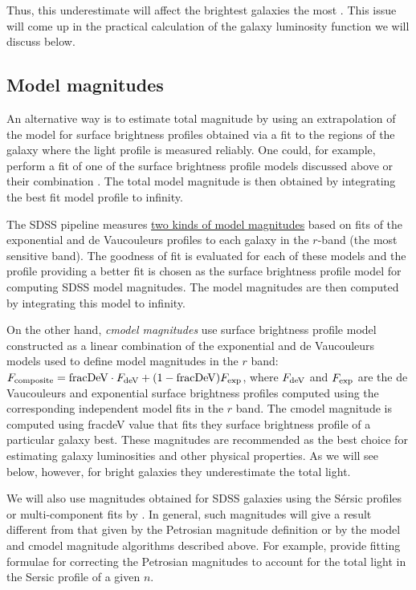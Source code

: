  Thus, this underestimate will affect the brightest galaxies the most \href{http://adsabs.harvard.edu/abs/2013MNRAS.436..697B}{\citep[see][]{bernardi_etal13}}. This issue will come up in the practical calculation of the galaxy luminosity function we will discuss below. 

\subsection{Model magnitudes}

An alternative way is to estimate total magnitude by using an extrapolation of the model for surface brightness profiles obtained via a fit to the regions of the galaxy where the light profile is measured reliably. One could, for example, perform a fit of one of the surface brightness profile models discussed above or their combination \citep[e.g., see][for a recent example of such fits for SDSS galaxies]{meert_etal15}. The total model magnitude is then obtained by integrating the best fit model profile to infinity. 

The SDSS pipeline measures \href{http://classic.sdss.org/dr7/algorithms/photometry.html}{two kinds of model magnitudes} based on fits of the exponential and de Vaucouleurs profiles to each galaxy in the $r$-band (the most sensitive band). The goodness of fit is evaluated for each of these models and the profile 
providing a better fit is chosen as the surface brightness profile model for computing SDSS model magnitudes. The model magnitudes are then computed by integrating this model to infinity.

On the other hand, {\it cmodel magnitudes}\/ use  surface brightness profile model constructed as a linear combination of  the exponential and de Vaucouleurs models used to define model magnitudes in the $r$ band: $F_{\rm composite} = {\rm fracDeV} \cdot F_{\rm deV} + (1 - {\rm fracDeV}) F_{\rm exp}$,
where $F_{\rm deV}$ and $F_{\rm exp}$ are the de Vaucouleurs and exponential surface brightness profiles computed using the corresponding independent model fits in the $r$ band. The cmodel magnitude is computed using fracdeV value that fits they surface brightness profile of a particular galaxy best. These magnitudes are recommended as the best choice for estimating galaxy luminosities and other physical properties. As we will see below, however, for bright galaxies they underestimate the total light.

We will also use magnitudes obtained for SDSS galaxies using the S\'ersic profiles or multi-component fits by \citet{meert_etal15}. 
In general, such magnitudes will give a result different from that given by the Petrosian magnitude definition or by the model and cmodel magnitude algorithms described above. For example, \href{http://adsabs.harvard.edu/abs/2005AJ....130.1535G}{\citet{graham_etal05}} provide fitting formulae for correcting the Petrosian magnitudes to account for the total light in the Sersic profile of a given $n$. 

